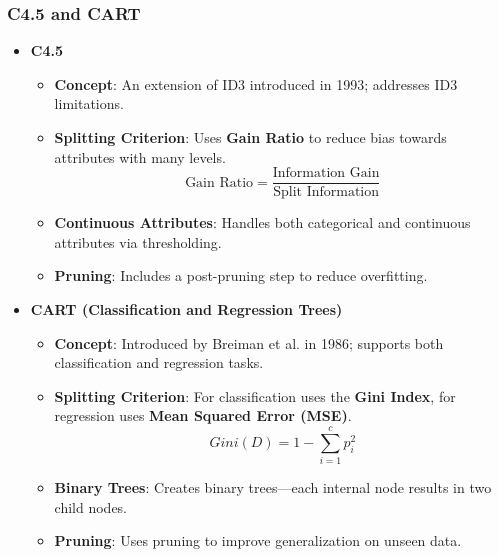 \documentclass[aspectratio=169]{beamer}
\begin{document}
\begin{frame}[fragile]
    \frametitle{C4.5 and CART}
    \begin{itemize}
        \item \textbf{C4.5}
        \begin{itemize}
            \item \textbf{Concept}: An extension of ID3 introduced in 1993; addresses ID3 limitations.
            \item \textbf{Splitting Criterion}: Uses \textbf{Gain Ratio} to reduce bias towards attributes with many levels.
            \begin{equation}
                \text{Gain Ratio} = \frac{\text{Information Gain}}{\text{Split Information}}
            \end{equation}
            \item \textbf{Continuous Attributes}: Handles both categorical and continuous attributes via thresholding.
            \item \textbf{Pruning}: Includes a post-pruning step to reduce overfitting.
        \end{itemize}

        \item \textbf{CART (Classification and Regression Trees)}
        \begin{itemize}
            \item \textbf{Concept}: Introduced by Breiman et al. in 1986; supports both classification and regression tasks.
            \item \textbf{Splitting Criterion}: For classification uses the \textbf{Gini Index}, for regression uses \textbf{Mean Squared Error (MSE)}.
            \begin{equation}
                Gini(D) = 1 - \sum_{i=1}^{c} p_i^2
            \end{equation}
            \item \textbf{Binary Trees}: Creates binary trees—each internal node results in two child nodes.
            \item \textbf{Pruning}: Uses pruning to improve generalization on unseen data.
        \end{itemize}
    \end{itemize}
\end{frame}
\end{document}
